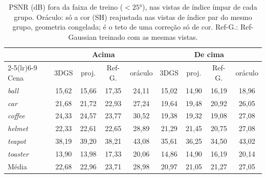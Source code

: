 \begin{table}[t]
\centering
\caption{PSNR (dB) fora da faixa de treino ($<25$°), nas vistas de índice ímpar de cada grupo. Oráculo: só a cor (SH) reajustada nas vistas de índice par do mesmo grupo, geometria congelada; é o teto de uma correção só de cor. Ref-G.: Ref-Gaussian treinado com as mesmas vistas.}
\label{tab:decomp25}
\setlength{\tabcolsep}{3pt}
\footnotesize
\begin{tabular}{l cccc cccc}
\toprule
 & \multicolumn{4}{c}{Acima} & \multicolumn{4}{c}{De cima} \\
\cmidrule(lr){2-5}\cmidrule(lr){6-9}
Cena & 3DGS & proj. & Ref-G. & oráculo & 3DGS & proj. & Ref-G. & oráculo \\
\midrule
\textit{ball} & 15{,}62 & 15{,}66 & 17{,}35 & 24{,}11 & 15{,}02 & 14{,}90 & 16{,}19 & 18{,}96 \\
\textit{car} & 21{,}68 & 21{,}72 & 22{,}93 & 27{,}24 & 19{,}64 & 19{,}48 & 20{,}92 & 26{,}05 \\
\textit{coffee} & 24{,}33 & 24{,}57 & 23{,}77 & 30{,}52 & 19{,}38 & 19{,}32 & 19{,}08 & 27{,}08 \\
\textit{helmet} & 22{,}33 & 22{,}61 & 22{,}65 & 28{,}89 & 21{,}29 & 21{,}45 & 20{,}75 & 27{,}08 \\
\textit{teapot} & 38{,}19 & 39{,}20 & 38{,}21 & 43{,}08 & 35{,}61 & 36{,}25 & 34{,}50 & 43{,}02 \\
\textit{toaster} & 13{,}90 & 13{,}98 & 17{,}33 & 20{,}06 & 14{,}86 & 14{,}90 & 16{,}19 & 20{,}14 \\
\midrule
Média & 22{,}68 & 22{,}96 & 23{,}71 & 28{,}98 & 20{,}97 & 21{,}05 & 21{,}27 & 27{,}05 \\
\bottomrule
\end{tabular}
\end{table}

